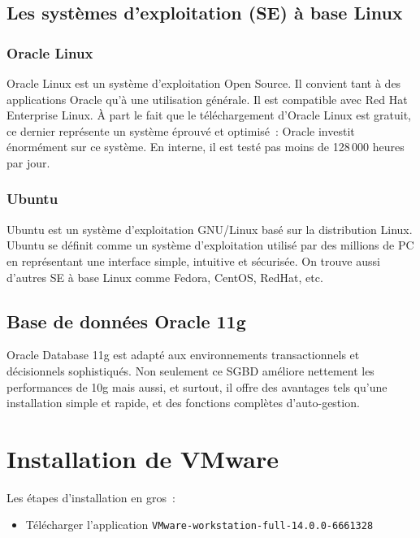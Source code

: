 \documentclass[12pt,a4paper]{report}
\begin{document}
\subsection{Les systèmes d'exploitation (SE) à base Linux}

\subsubsection{Oracle Linux}

Oracle Linux est un système d'exploitation Open Source. Il convient tant à des
applications Oracle qu'à une utilisation générale. Il est compatible avec
Red Hat Enterprise Linux. À part le fait que le téléchargement d'Oracle Linux
est gratuit, ce dernier représente un système éprouvé et optimisé~: Oracle
investit énormément sur ce système. En interne, il est testé pas moins de
128\,000 heures par jour.

\subsubsection{Ubuntu}

Ubuntu est un système d'exploitation GNU/Linux basé sur la distribution Linux.
Ubuntu se définit comme un système d'exploitation utilisé par des millions de
PC en représentant une interface simple, intuitive et sécurisée. On trouve aussi
d'autres SE à base Linux comme Fedora, CentOS, RedHat, etc.

\subsection{Base de données Oracle 11g}

Oracle Database 11g est adapté aux environnements transactionnels et décisionnels
sophistiqués. Non seulement ce SGBD améliore nettement les performances de 10g
mais aussi, et surtout, il offre des avantages tels qu'une installation simple et
rapide, et des fonctions complètes d'auto-gestion.

\section{Installation de VMware}

Les étapes d'installation en gros~:

\begin{itemize}[leftmargin=*]
  \item Télécharger l'application
        \texttt{VMware-workstation-full-14.0.0-6661328}
\end{itemize}
\end{document}
